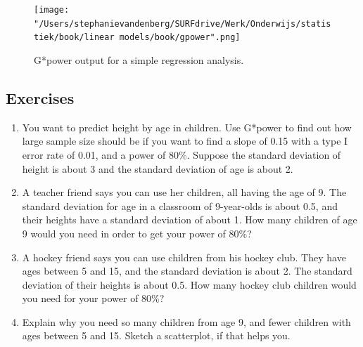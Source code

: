 \documentclass[]{report}\usepackage[]{graphicx}\usepackage[]{color}
\begin{document}
\begin{figure}[h]
    \begin{center}
       \texttt{[image: "/Users/stephanievandenberg/SURFdrive/Werk/Onderwijs/statistiek/book/linear models/book/gpower".png]}
    \end{center}
    \caption{G*power output for a simple regression analysis.}
    \label{fig:gpower}
\end{figure}



\subsection{Exercises}


\begin{enumerate}

\item You want to predict height by age in children. Use G*power to find out how large sample size should be if you want to find a slope of 0.15 with a type I error rate of 0.01, and a power of 80\%. Suppose the standard deviation of height is about 3 and the standard deviation of age is about 2.

\item A teacher friend says you can use her children, all having the age of 9. The standard deviation for age in a classroom of 9-year-olds is about 0.5, and their heights have a standard deviation of about 1. How many children of age 9 would you need in order to get your power of 80\%?

\item A hockey friend says you can use children from his hockey club. They have ages between 5 and 15, and the standard deviation is about 2. The standard deviation of their heights is about 0.5. How many hockey club children would you need for your power of 80\%?

\item Explain why you need so many children from age 9, and fewer children with ages between 5 and 15. Sketch a scatterplot, if that helps you.


\end{enumerate}
\end{document}
